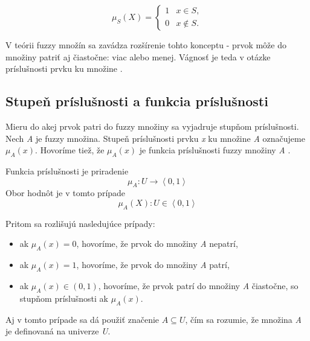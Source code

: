\begin{equation}\label{charfunkciafuzzy}
\mu_S (X) = 
\begin{cases}
1 &  x \in S, \\
0 &  x \notin S.
\end{cases}
\end{equation}

V teórii fuzzy množín sa zavádza rozšírenie tohto konceptu - prvok môže do množiny patriť aj čiastočne: viac alebo menej. Vágnosť je teda v otázke príslušnosti prvku ku množine \cite{gregorUI} .

\subsection*{Stupeň príslušnosti a funkcia príslušnosti}
Mieru do akej prvok patri do fuzzy množiny sa vyjadruje stupňom príslušnosti. Nech \textit{A }je fuzzy množina. Stupeň príslušnosti prvku \textit{x} ku množine \textit{A} označujeme $\mu_A\left( x\right) $. 
Hovoríme tiež, že $\mu_A\left( x\right) $ je funkcia príslušnosti fuzzy množiny \textit{A} \cite{gregorUI, gregorRef14} .


Funkcia príslušnosti je priradenie
\begin{equation}\label{funPrislus}
\mu_A : U \longrightarrow \left\langle 0, 1 \right\rangle 
\end{equation}
Obor hodnôt je v tomto prípade 
\begin{equation}\label{funPrislus}
\mu_A (X) : U \in \left\langle 0, 1 \right\rangle 
\end{equation}



Pritom sa rozlišujú nasledujúce prípady: 
\begin{itemize}
	\item ak $\mu_A (x) = 0$, hovoríme, že prvok do množiny \textit{A }nepatrí, 
	\item ak $\mu_A (x) = 1$, hovoríme, že prvok do množiny \textit{A} patrí, 
	\item ak $\mu_A (x) \in (0, 1)$, hovoríme, že prvok patrí do množiny \textit{A} čiastočne, so stupňom príslušnosti ak $\mu_A(x)$. 
\end{itemize}

Aj v tomto prípade sa dá použiť značenie $A\subseteq U$, čím sa rozumie, že množina \textit{A} je definovaná na univerze \textit{U}.  \cite{gregorUI} 

